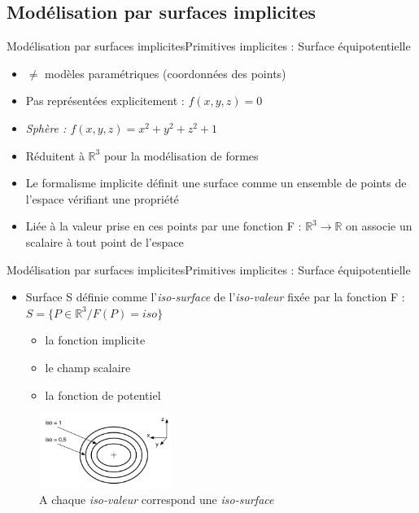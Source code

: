\documentclass{beamer}
\begin{document}
\subsection{Modélisation par surfaces implicites}
\begin{frame}[c]{Modélisation par surfaces implicites}{Primitives implicites : Surface équipotentielle}
\begin{itemize}
\item<1->  $\ne$ modèles paramétriques (coordonnées des points)
\item<1-> Pas représentées explicitement : $f(x,y,z)=0$
\item<1-> \textit{Sphère : $f(x,y,z)=x^2 + y^2 +z^2 +1$}
\newline
\item<2-> Réduitent à  $\mathbb{R}^3$ pour la modélisation de formes
\item<2-> Le formalisme implicite définit une surface comme un ensemble de points de l’espace vérifiant une propriété
\item <2->Liée à la valeur prise en ces points par une fonction
\newline F : $\mathbb{R}^3 \rightarrow \mathbb{R}$ on associe un scalaire à tout point de l'espace
\end{itemize}
\end{frame}


\begin{frame}[c]{Modélisation par surfaces implicites}{Primitives implicites : Surface équipotentielle}
\begin{itemize}
\item Surface S définie comme l’\textit{iso-surface} de l'\textit{iso-valeur} fixée par la fonction F : $S=\{P \in\mathbb{R}^3 / F(P)=iso\}$
\begin{itemize}
\item la fonction implicite
\item le champ scalaire
\item la fonction de potentiel %
\end{itemize}
\end{itemize}
\begin{center}
\begin{figure}
\parbox{5cm}{\caption{A chaque \textit{iso-valeur} correspond une \textit{iso-surface}}}
\parbox{6cm}{\includegraphics[width=4.3cm]{surfaceImplicite/iso.png}}
\end{figure}

\end{center}
\end{frame}
\end{document}
